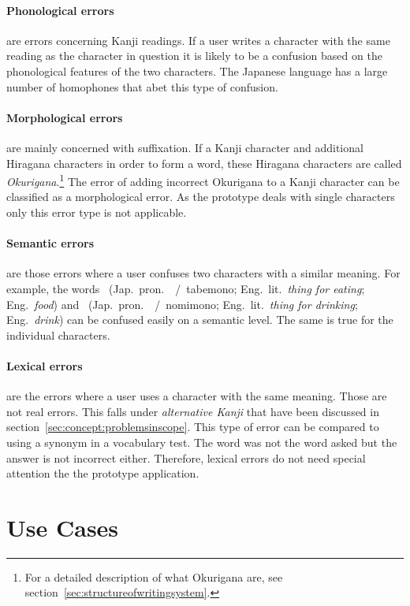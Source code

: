 \paragraph{Phonological errors} are errors concerning Kanji readings. If a user
writes a character with the same reading as the character in question it is 
likely to be a confusion based on the phonological features of the two 
characters. The Japanese language has a large number of homophones that abet
this type of confusion.

\paragraph{Morphological errors} are mainly concerned with suffixation.
If a Kanji character and additional Hiragana characters in order to form a word,
these Hiragana characters are called \emph{Okurigana}.\footnote{For a detailed 
description of what Okurigana are, see 
section~\ref{sec:structureofwritingsystem}.}
The error of adding incorrect Okurigana to a Kanji character can be classified
as a morphological error. As the prototype deals with single 
characters only this error type is not applicable.

\paragraph{Semantic errors} are those errors where a user confuses two characters
with a similar meaning. For example, the words 
~(Jap.~pron.~~/~tabemono; 
Eng.~lit.~\emph{thing for eating}; Eng.~\emph{food}) 
and 
~(Jap.~pron.~~/~nomimono; 
Eng.~lit.~\emph{thing for drinking}; Eng.~\emph{drink})
can be confused easily on a semantic level. The same is true for the individual 
characters.
 
\paragraph{Lexical errors} are the errors where a user uses a character with the
same meaning. Those are not real errors. This falls under 
\emph{alternative Kanji} that have been discussed in 
section~\ref{sec:concept:problemsinscope}.
This type of error can be compared to using a synonym in a vocabulary test.
The word was not the word asked but the answer is not incorrect either.
Therefore, lexical errors do not need special attention the the prototype
application.

\section{Use Cases}
\label{sec:concept:usecases}

